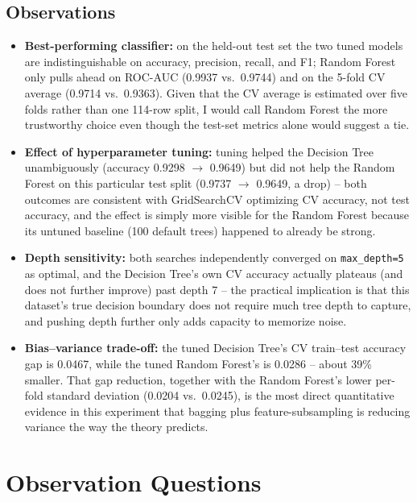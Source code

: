 \documentclass[11pt,a4paper]{article}
\begin{document}
\subsection{Observations}
\begin{itemize}[nosep]
  \item \textbf{Best-performing classifier:} on the held-out test set the two tuned models are indistinguishable on accuracy, precision, recall, and F1; Random Forest only pulls ahead on ROC-AUC (0.9937 vs.\ 0.9744) and on the 5-fold CV average (0.9714 vs.\ 0.9363). Given that the CV average is estimated over five folds rather than one 114-row split, I would call Random Forest the more trustworthy choice even though the test-set metrics alone would suggest a tie.
  \item \textbf{Effect of hyperparameter tuning:} tuning helped the Decision Tree unambiguously (accuracy 0.9298 $\to$ 0.9649) but did not help the Random Forest on this particular test split (0.9737 $\to$ 0.9649, a drop) -- both outcomes are consistent with GridSearchCV optimizing CV accuracy, not test accuracy, and the effect is simply more visible for the Random Forest because its untuned baseline (100 default trees) happened to already be strong.
  \item \textbf{Depth sensitivity:} both searches independently converged on \texttt{max\_depth=5} as optimal, and the Decision Tree's own CV accuracy actually plateaus (and does not further improve) past depth 7 -- the practical implication is that this dataset's true decision boundary does not require much tree depth to capture, and pushing depth further only adds capacity to memorize noise.
  \item \textbf{Bias--variance trade-off:} the tuned Decision Tree's CV train--test accuracy gap is 0.0467, while the tuned Random Forest's is 0.0286 -- about 39\% smaller. That gap reduction, together with the Random Forest's lower per-fold standard deviation (0.0204 vs.\ 0.0245), is the most direct quantitative evidence in this experiment that bagging plus feature-subsampling is reducing variance the way the theory predicts.
\end{itemize}

\section{Observation Questions}
\end{document}
